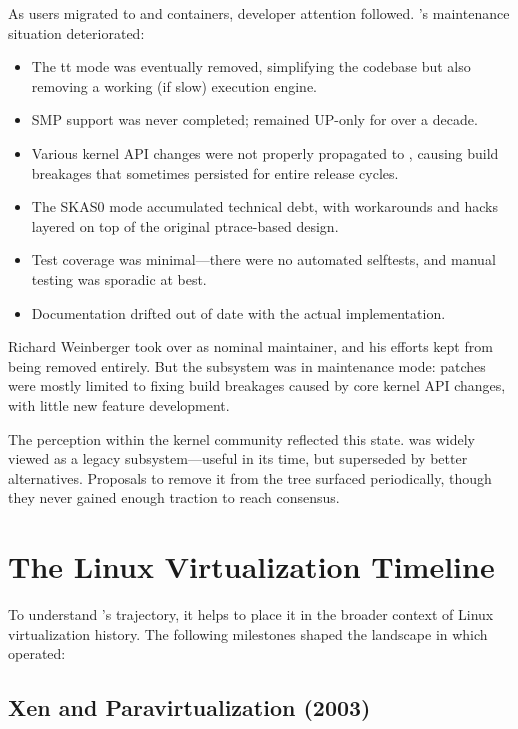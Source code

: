 As users migrated to \KVM{} and containers, developer attention followed.
\UML{}'s maintenance situation deteriorated:

\begin{itemize}[nosep]
  \item The tt mode was eventually removed, simplifying the codebase but
    also removing a working (if slow) execution engine.
  \item SMP support was never completed; \UML{} remained UP-only for over
    a decade.
  \item Various kernel API changes were not properly propagated to
    , causing build breakages that sometimes persisted
    for entire release cycles.
  \item The SKAS0 mode accumulated technical debt, with workarounds and
    hacks layered on top of the original ptrace-based design.
  \item Test coverage was minimal---there were no automated selftests, and
    manual testing was sporadic at best.
  \item Documentation drifted out of date with the actual implementation.
\end{itemize}

\noindent
Richard Weinberger took over as nominal maintainer, and his efforts kept
\UML{} from being removed entirely.  But the subsystem was in maintenance
mode: patches were mostly limited to fixing build breakages caused by core
kernel API changes, with little new feature development.

The perception within the kernel community reflected this state.  \UML{} was
widely viewed as a legacy subsystem---useful in its time, but superseded by
better alternatives.  Proposals to remove it from the tree surfaced
periodically, though they never gained enough traction to reach consensus.

\section{The Linux Virtualization Timeline}
\label{sec:history-virt-timeline}

To understand \UML{}'s trajectory, it helps to place it in the broader context
of Linux virtualization history.  The following milestones shaped the landscape
in which \UML{} operated:

\subsection{Xen and Paravirtualization (2003)}
\label{sec:history-xen}

